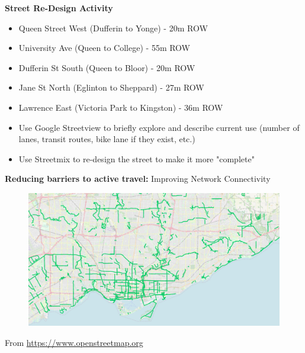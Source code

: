 \documentclass[aspectratio=169]{beamer}
\begin{document}
\begin{frame}
	
	\textbf{Street Re-Design Activity}


	\vspace{4mm}
	
	\begin{itemize}
		\item Queen Street West (Dufferin to Yonge) - 20m ROW
		\item University Ave (Queen to College) - 55m ROW
		\item Dufferin St South (Queen to Bloor) - 20m ROW
		\item Jane St North (Eglinton to Sheppard) - 27m ROW
		\item Lawrence East (Victoria Park to Kingston) - 36m ROW
	\end{itemize}

	
	\vspace{4mm}
	
	
	\begin{itemize}
		\item Use Google Streetview to briefly explore and describe current use (number of lanes, transit routes, bike lane if they exist, etc.)
		\item Use Streetmix to re-design the street to make it more "complete"
	\end{itemize}
	
\end{frame}



\begin{frame}
	
	\textbf{Reducing barriers to active travel:} Improving Network Connectivity
	
	\begin{figure}
		\centering
		\includegraphics[width=1\linewidth]{images/bike_network_tor.png}
	\end{figure}
	
	\tiny From \url{https://www.openstreetmap.org}
	
\end{frame}
\end{document}

